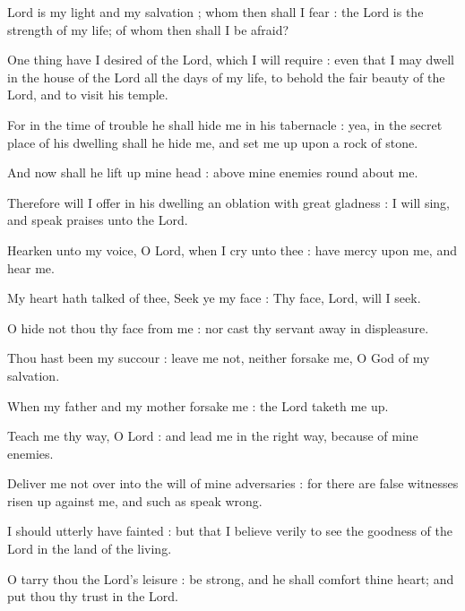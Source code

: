  Lord is my light and my salvation ; whom then shall I fear : the Lord is the strength of my life; of whom then shall I be afraid?\par
{}
One thing have I desired of the Lord, which I will require : even that I may dwell in the house of the Lord all the days of my life, to behold the fair beauty of the Lord, and to visit his temple.\par
{}For in the time of trouble he shall hide me in his tabernacle : yea, in the secret place of his dwelling shall he hide me, and set me up upon a rock of stone.\par
{}And now shall he lift up mine head : above mine enemies round about me.\par
{}Therefore will I offer in his dwelling an oblation with great gladness : I will sing, and speak praises unto the Lord.\par
{}Hearken unto my voice, O Lord, when I cry unto thee : have mercy upon me, and hear me.\par
{}My heart hath talked of thee, Seek ye my face : Thy face, Lord, will I seek.\par
{}O hide not thou thy face from me : nor cast thy servant away in displeasure.\par
{}Thou hast been my succour : leave me not, neither forsake me, O God of my salvation.\par
{}When my father and my mother forsake me : the Lord taketh me up.\par
{}Teach me thy way, O Lord : and lead me in the right way, because of mine enemies.\par
{}Deliver me not over into the will of mine adversaries : for there are false witnesses risen up against me, and such as speak wrong.\par
{}I should utterly have fainted : but that I believe verily to see the goodness of the Lord in the land of the living.\par
{}O tarry thou the Lord's leisure : be strong, and he shall comfort thine heart; and put thou thy trust in the Lord.\par

